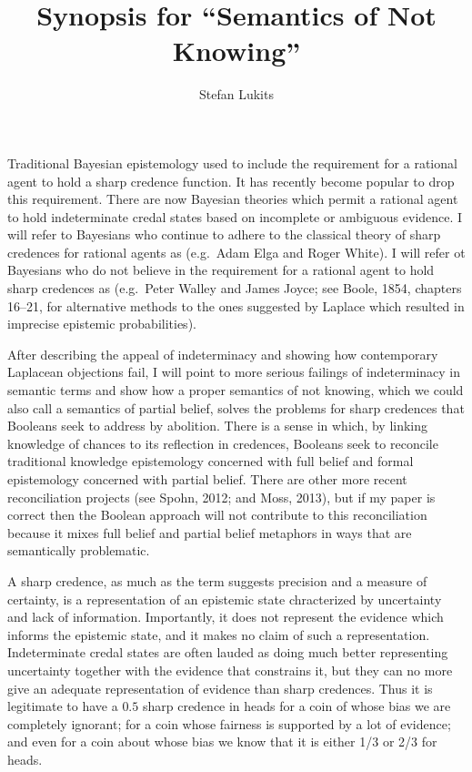 \documentclass[11pt]{article}
\begin{document}
\title{Synopsis for ``Semantics of Not Knowing''}
\author{Stefan Lukits}
\date{}
\maketitle

Traditional Bayesian epistemology used to include the requirement for
a rational agent to hold a sharp credence function. It has recently
become popular to drop this requirement. There are now Bayesian
theories which permit a rational agent to hold indeterminate credal
states based on incomplete or ambiguous evidence. I will refer to
Bayesians who continue to adhere to the classical theory of sharp
credences for rational agents as  (e.g.\ Adam Elga
and Roger White). I will refer ot Bayesians who do not believe in the
requirement for a rational agent to hold sharp credences as
 (e.g.\ Peter Walley and James Joyce; see Boole, 1854,
chapters 16--21, for alternative methods to the ones suggested by
Laplace which resulted in imprecise epistemic probabilities).

After describing the appeal of indeterminacy and showing how
contemporary Laplacean objections fail, I will point to more serious
failings of indeterminacy in semantic terms and show how a proper
semantics of not knowing, which we could also call a semantics of
partial belief, solves the problems for sharp credences that Booleans
seek to address by abolition. There is a sense in which, by linking
knowledge of chances to its reflection in credences, Booleans seek to
reconcile traditional knowledge epistemology concerned with full
belief and formal epistemology concerned with partial belief. There
are other more recent reconciliation projects (see Spohn, 2012; and
Moss, 2013), but if my paper is correct then the Boolean approach will
not contribute to this reconciliation because it mixes full belief and
partial belief metaphors in ways that are semantically problematic.

A sharp credence, as much as the term suggests precision and a measure
of certainty, is a representation of an epistemic state chracterized
by uncertainty and lack of information. Importantly, it does not
represent the evidence which informs the epistemic state, and it makes
no claim of such a representation. Indeterminate credal states are
often lauded as doing much better representing uncertainty together
with the evidence that constrains it, but they can no more give an
adequate representation of evidence than sharp credences. Thus it is
legitimate to have a $0.5$ sharp credence in heads for a coin of whose
bias we are completely ignorant; for a coin whose fairness is
supported by a lot of evidence; and even for a coin about whose bias
we know that it is either 1/3 or 2/3 for heads.
\end{document}
